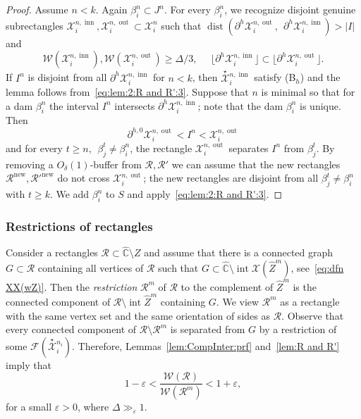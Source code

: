 \documentclass{amsart}
\renewcommand{\sp}{{\ \ }}
\newcommand{\1}{{\mathbb 1 }}
\newcommand{\upstar}[1]{\overset{\star}{ #1}{}}
\newcommand{\Fam}{{\mathcal F}}
\newcommand{\Width}{{\mathcal W}}
\newcommand{\bDelta}{{\mathbb{\Delta}}}
\newcommand\RR{\mathcal{R}}
\newcommand\XX{\mathcal{X}}
\newcommand\intr{\operatorname{int}}
\newcommand{\wZ}{{\widehat Z}}
\newcommand\inn{{\operatorname{inn}}}
\newcommand\out{{\operatorname{out}}}
\newcommand\new{{\operatorname{new}}}
\newcommand{\wC}{\widehat{\mathbb{C}}}
\theoremstyle{remark}
\numberwithin{equation}{section}
\theoremstyle{definition}
\newcommand{\dist}{\operatorname{dist}}
\begin{document}
\begin{proof}
 Assume $n<k$. Again $\beta^n_i\subset J^n$. For every $\beta^n_i$, we recognize disjoint genuine subrectangles $\XX^{n,\inn}_i,\XX^{n,\out}_i\subset \XX^n_i$ such that $\dist(\partial^h \XX^{n,\out}_i,\sp \partial^h \XX^{n,\inn}_i)>|I|$ and
 \[  \Width(\XX^{n,\inn}_i), \Width(\XX^{n,\out}_i)\ge \bDelta/3,\sp\sp\sp \lfloor \partial^h\XX^{n,\inn}_i \rfloor\subset \lfloor\partial^h \XX^{n,\out}_i \rfloor.\]
If $I^n$ is disjoint from all $\partial ^h\XX^{n,\inn}_i $ for $n<k$, then $\upstar\XX^{n,\inn}_i $ satisfy (B${}_{h}$) and the lemma follows from~\eqref{eq:lem:2:R and R':3}. Suppose that $n$ is minimal so that for a dam $\beta^n_i$ the interval $I^n$ intersects $\partial ^h\XX^{n,\inn}_i$; note that the dam $\beta^n_i$ is unique. Then \[\partial^{h,0}\XX^{n,\out}_i<I^n< \XX^{n,\out}_i\] and for every $t\ge n, \sp \beta^{t}_j\not=\beta^n_i$, the rectangle $\XX^{n,\out}_i$ separates $I^n$ from $ \beta^{t}_j$. By removing a $O_\delta(1)$-buffer from $\RR,\RR'$ we can assume that the new rectangles $\RR^\new, \RR'^\new$ do not cross $\XX^{n,\out}_i$; the new rectangles are disjoint from all $\beta^t_j\not=\beta^n_i$ with $t\ge k$. We add $\beta^n_i$ to $S$ and apply~\eqref{eq:lem:2:R and R':3}.
\end{proof}





\subsubsection{Restrictions of rectangles}\label{sss:RestrOfFamil} Consider a rectangles $\RR\subset \wC\setminus Z$ and assume that there is a connected graph $G\subset \RR$ containing all vertices of $\RR$ such that $G\subset \wC\setminus \intr \XX(\wZ^m)$, see~\eqref{eq:dfn XX(wZ)}. Then the \emph{restriction} $\RR^m$ of $\RR$ to the complement of $\wZ^m$ is the connected component of $\RR\setminus \intr \wZ^m$ containing $G$. We view $\RR^m$ as a rectangle with the same vertex set and the same orientation of sides as $\RR$. Observe that every connected component of $\RR\setminus \RR^m$ is separated from $G$ by a restriction of some $\Fam(\upstar\XX^{n_i}_i)$. Therefore, Lemmas~\ref{lem:CompInter:prf} and~\ref{lem:R and R'} imply that
\begin{equation}
\label{eq:lem:RR vs RR^m}
 1-\varepsilon < \frac{\Width(\RR)}{\Width(\RR^m)}<1+\varepsilon, 
 \end{equation}
 for a small $\varepsilon>0$, where $\bDelta\gg_\varepsilon 1$.
 
\end{document}
